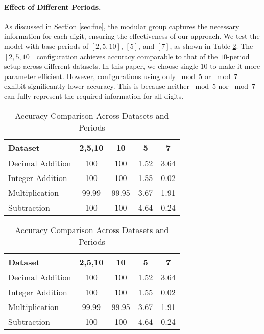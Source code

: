 \paragraph{Effect of Different Periods.}
As discussed in Section \ref{sec:fne}, the modular group captures the necessary information for each digit, ensuring the effectiveness of our approach. We test the model with base periods of $[2, 5, 10]$, $[5]$, and $[7]$, as shown in Table \ref{tab:modular_task_comparison}. The $[2, 5, 10]$ configuration achieves accuracy comparable to that of the $10$-period setup across different datasets. In this paper, we choose single $10$ to make it more parameter efficient. However, configurations using only $\bmod 5$ or $\bmod 7$ exhibit significantly lower accuracy. This is because neither $\bmod 5$ nor $\bmod 7$ can fully represent the required information for all digits.

\ifdefined\isarxiv

\begin{table}[ht]
\centering
\setlength{\tabcolsep}{4pt} %
\caption{Accuracy Comparison Across Datasets and Periods}
\label{tab:modular_task_comparison}
\begin{tabular}{lcccc}
\toprule
\textbf{Dataset} & \textbf{2,5,10} & \textbf{10} & \textbf{5} & \textbf{7} \\ 
\midrule
Decimal Addition  & 100   & 100   & 1.52 & 3.64 \\ 
Integer Addition  & 100   & 100   & 1.55 & 0.02 \\ 
Multiplication    & 99.99 & 99.95 & 3.67 & 1.91 \\ 
Subtraction       & 100   & 100   & 4.64 & 0.24 \\ 
\bottomrule
\end{tabular}
\end{table}
\else

\begin{table}[ht]
\centering
\small %
\setlength{\tabcolsep}{4pt} %
\caption{Accuracy Comparison Across Datasets and Periods}
\label{tab:modular_task_comparison}
\begin{tabular}{lcccc}
\toprule
\textbf{Dataset} & \textbf{2,5,10} & \textbf{10} & \textbf{5} & \textbf{7} \\ 
\midrule
Decimal Addition  & 100   & 100   & 1.52 & 3.64 \\ 
Integer Addition  & 100   & 100   & 1.55 & 0.02 \\ 
Multiplication    & 99.99 & 99.95 & 3.67 & 1.91 \\ 
Subtraction       & 100   & 100   & 4.64 & 0.24 \\ 
\bottomrule
\end{tabular}
\vspace{-5mm} 
\end{table}
\fi

